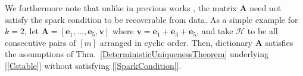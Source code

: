 \documentclass[9pt,twocolumn]{pnas-new}
\renewcommand{\eqref}[1]{\textnormal{[\ref{#1}]}}
\begin{document}




We furthermore note that unlike in previous works \cite{li2004analysis, Georgiev05, Aharon06, Hillar15}, the matrix $\mathbf{A}$ need not satisfy the spark condition to be recoverable from data. As a simple example for $k=2$, let $\mathbf{A} = [ \mathbf{e}_1, \ldots, \mathbf{e}_5, \mathbf{v}]$ where $\mathbf{v} = \mathbf{e}_1 + \mathbf{e}_3 + \mathbf{e}_5$, and take $\mathcal{H}$ to be all consecutive pairs of $[m]$ arranged in cyclic order. Then, dictionary $\mathbf{A}$ satisfies the assumptions of Thm.~\ref{DeterministicUniquenessTheorem} underlying \eqref{Cstable} without satisfying \eqref{SparkCondition}. %
\end{document}
